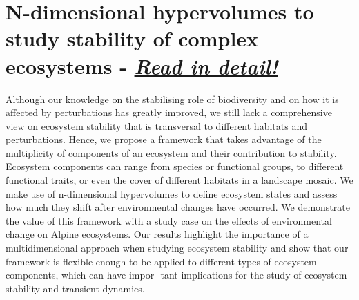 \documentclass[11pt]{article}
\begin{document}
	
	\section*{N-dimensional hypervolumes to study stability of complex ecosystems \citep{Barros2016} - \underline{\textit{Read in detail!}}}
	
	Although our knowledge on the stabilising role of biodiversity and on how it is affected by perturbations has greatly improved, we still lack a comprehensive view on ecosystem stability that is transversal to different habitats and perturbations. Hence, we propose a framework that takes advantage of the multiplicity of components of an ecosystem and their contribution to stability. Ecosystem components can range from species or functional groups, to different functional traits, or even the cover of different habitats in a landscape mosaic. We make use of n-dimensional hypervolumes to define ecosystem states and assess how much they shift after environmental changes have occurred. We demonstrate the value of this framework with a study case on the effects of environmental change on Alpine ecosystems. Our results highlight the importance of a multidimensional approach when studying ecosystem stability and show that our framework is flexible enough to be applied to different types of ecosystem components, which can have impor- tant implications for the study of ecosystem stability and transient dynamics.
	
\end{document}
